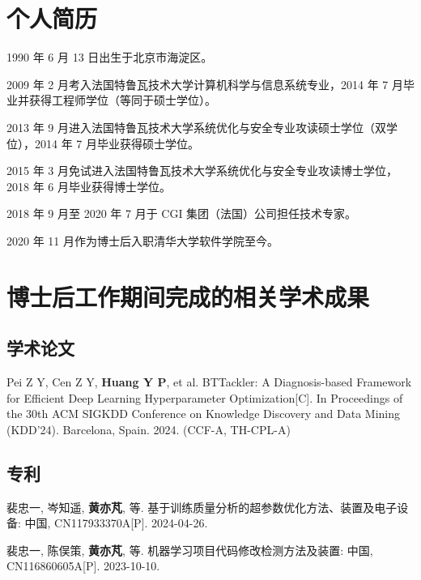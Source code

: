 
\begin{resume}

  \section*{个人简历}

  1990 年 6 月 13 日出生于北京市海淀区。

  2009 年 2 月考入法国特鲁瓦技术大学计算机科学与信息系统专业，2014 年 7 月毕业并获得工程师学位（等同于硕士学位）。

  2013 年 9 月进入法国特鲁瓦技术大学系统优化与安全专业攻读硕士学位（双学位），2014 年 7 月毕业获得硕士学位。

  2015 年 3 月免试进入法国特鲁瓦技术大学系统优化与安全专业攻读博士学位，2018 年 6 月毕业获得博士学位。

  2018 年 9 月至 2020 年 7 月于 CGI 集团（法国）公司担任技术专家。

  2020 年 11 月作为博士后入职清华大学软件学院至今。


  \section*{博士后工作期间完成的相关学术成果}

  \subsection*{学术论文}

  \begin{achievements}
    \item Pei Z Y, Cen Z Y, \textbf{Huang Y P}, et al. BTTackler: A Diagnosis-based Framework for Efficient Deep Learning Hyperparameter Optimization[C]. In Proceedings of the 30th ACM SIGKDD Conference on Knowledge Discovery and Data Mining (KDD'24). Barcelona, Spain. 2024. (CCF-A, TH-CPL-A)
  \end{achievements}


  \subsection*{专利}

  \begin{achievements}
    \item 裴忠一, 岑知遥, \textbf{黄亦芃}, 等. 基于训练质量分析的超参数优化方法、装置及电子设备: 中国, CN117933370A[P]. 2024-04-26.
    \item 裴忠一, 陈俣策, \textbf{黄亦芃}, 等. 机器学习项目代码修改检测方法及装置: 中国, CN116860605A[P]. 2023-10-10.
  \end{achievements}

\end{resume}
